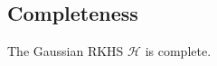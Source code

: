 

\subsection{Completeness}
\begin{lemma}
    The Gaussian RKHS $\mathcal{H}$ is complete.
\end{lemma}







